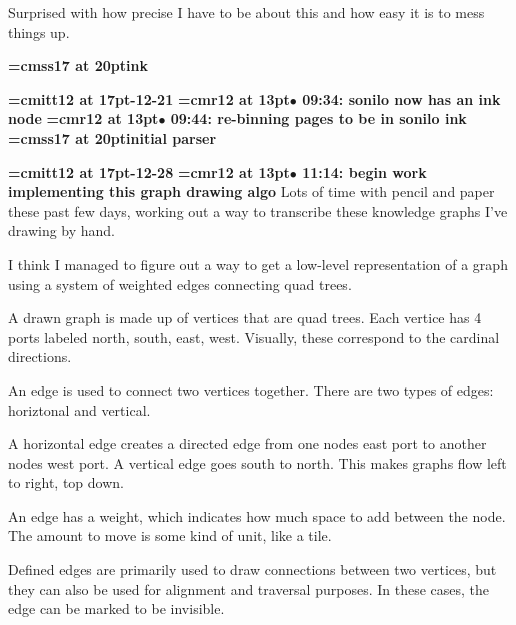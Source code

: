 Surprised with how precise I have to be about this and how easy it is to mess things up.
\par

{\medskip\noindent\bf\font\titlefont=cmss17 at 20pt\titlefont ink}\medskip

{\medskip\noindent\bf\font\titlefont=cmitt12 at 17pt-12-21}\medskip
{\smallskip\noindent\bf\font\titlefont=cmr12 at 13pt\titlefont $\bullet$ 09:34: sonilo now has an ink node}\smallskip
{\smallskip\noindent\bf\font\titlefont=cmr12 at 13pt\titlefont $\bullet$ 09:44: re-binning pages to be in sonilo ink}\smallskip
{}
{\medskip\noindent\bf\font\titlefont=cmss17 at 20pt\titlefont initial parser}\medskip

{\medskip\noindent\bf\font\titlefont=cmitt12 at 17pt-12-28}\medskip
{\smallskip\noindent\bf\font\titlefont=cmr12 at 13pt\titlefont $\bullet$ 11:14: begin work implementing this graph drawing algo}\smallskip
Lots of time with pencil and paper these past few days, working out a way to transcribe these knowledge graphs I've drawing by hand.
\par

I think I managed to figure out a way to get a low-level representation of a graph using a system of weighted edges connecting quad trees.
\par

A drawn graph is made up of vertices that are quad trees. Each vertice has 4 ports labeled north, south, east, west. Visually, these correspond to the cardinal directions.
\par

An edge is used to connect two vertices together. There are two types of edges: horiztonal and vertical.
\par

A horizontal edge creates a directed edge from one nodes east port to another nodes west port. A vertical edge goes south to north. This makes graphs flow left to right, top down.
\par

An edge has a weight, which indicates how much space to add between the node. The amount to move is some kind of unit, like a tile.
\par

Defined edges are primarily used to draw connections between two vertices, but they can also be used for alignment and traversal purposes. In these cases, the edge can be marked to be invisible.
\par


